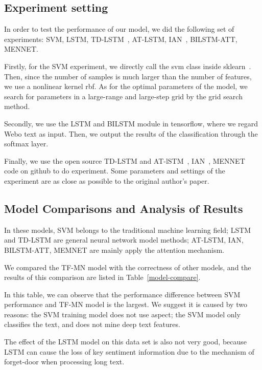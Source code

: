 \documentclass{ieeeaccess}
\begin{document}
\subsection{Experiment setting}

In order to test the performance of our model, we did the following set of experiments: SVM, LSTM, TD-LSTM~\cite{DBLP:conf/emnlp/WangHZZ16}, AT-LSTM\cite{DBLP:conf/emnlp/WangHZZ16}, IAN~\cite{DBLP:conf/ijcai/MaLZW17}, BILSTM-ATT, MENNET\cite{MENNET}.

Firstly, for the SVM experiment, we directly call the svm class inside sklearn~\cite{sklearn}. Then, since the number of samples is much larger than the number of features, we use a nonlinear kernel rbf. As for the optimal parameters of the model, we search for parameters in a large-range and large-step grid by the grid search method.

Secondly, we use the LSTM and BILSTM module in tensorflow, where we regard Webo text as input. Then, we output the results of the classification through the softmax layer.

Finally, we use the open source TD-LSTM and AT-lSTM~\cite{td-lstm_at-lstm}, IAN~\cite{IAN}, MENNET~\cite{MENNET} code on github to do experiment. Some parameters and settings of the experiment are as close as possible to the original author's paper.

\subsection{Model Comparisons and Analysis of Results}

In these models, SVM belongs to the traditional machine learning field; LSTM and TD-LSTM are general neural network model methods; AT-LSTM, IAN, BILSTM-ATT, MEMNET are mainly apply the attention mechanism.

We compared the TF-MN model with the correctness of other models, and the results of this comparison are listed in Table~\ref{model-compare}. 

In this table, we can observe that the performance difference between SVM performance and TF-MN model is the largest. We suggest it is caused by two reasons: the SVM training model does not use aspect; the SVM model only classifies the text, and does not mine deep text features. 

The effect of the LSTM model on this data set is also not very good, because LSTM can cause the loss of key sentiment information due to the mechanism of forget-door when processing long text.
\end{document}
